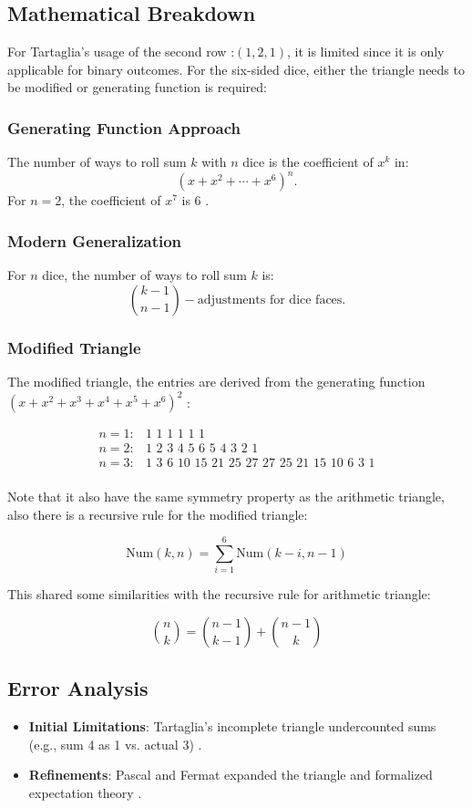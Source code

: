 \documentclass{article}
\begin{document}
\subsection{Mathematical Breakdown}

For Tartaglia's usage of the second row :\((1,2,1)\), it is limited since it is only applicable for binary outcomes. For the six-sided dice, either the triangle needs to be modified or generating function is required:

\subsubsection{Generating Function Approach}
The number of ways to roll sum \(k\) with \(n\) dice is the coefficient of \(x^k\) in:
\[
(x + x^2 + \cdots + x^6)^n.
\]
For \(n = 2\), the coefficient of \(x^7\) is 6 \cite{pascal1654}.

\subsubsection{Modern Generalization}
For \(n\) dice, the number of ways to roll sum \(k\) is:
\[
\binom{k - 1}{n - 1} - \text{adjustments for dice faces}.
\]

\subsubsection{Modified Triangle}

The modified triangle, the entries are derived from the generating function $(x+x^2+x^3+x^4+x^5+x^6)^2$ :

\begin{align*}
    n=1:& \text{1 1 1 1 1 1}\\
n=2:& \text{1 2 3 4 5 6 5 4 3 2 1}\\
n=3:& \text{1 3 6 10 15 21 25 27 27 25 21 15 10 6 3 1}\\
\end{align*}

Note that it also have the same symmetry property as the arithmetic triangle, also there is a recursive rule for the modified triangle:

\[
\text{Num}(k,n)=\sum^{6}_{i=1}\text{Num}(k-i,n-1)
\]

This shared some similarities with the recursive rule for arithmetic triangle:

\[
\binom{n}{k}=\binom{n-1}{k-1}+\binom{n-1}{k}
\]

\subsection{Error Analysis}
\begin{itemize}
\item \textbf{Initial Limitations}: Tartaglia's incomplete triangle undercounted sums (e.g., sum 4 as 1 vs. actual 3) \cite{tartaglia1556}.
\item \textbf{Refinements}: Pascal and Fermat expanded the triangle and formalized expectation theory \cite{pascal1654}.
\end{itemize}
\end{document}

